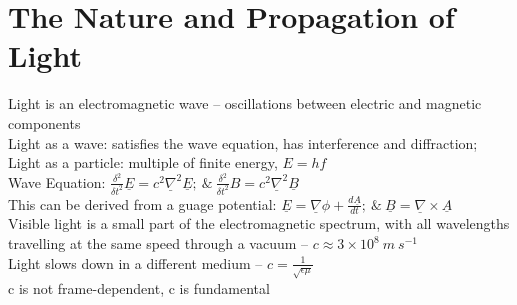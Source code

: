 \documentclass[a4paper, 11pt, fleqn, normalem]{report}
\begin{document}
\section{The Nature and Propagation of Light}
Light is an electromagnetic wave -- oscillations between electric and magnetic components \\
Light as a wave: satisfies the wave equation, has interference and diffraction; \\
Light as a particle: multiple of finite energy, $E = hf$ \\
Wave Equation: $\frac{\delta^{2}}{\delta t^{2}}\underline{E} = c^{2}\underline{\nabla}^{2}\underline{E};~\&~ \frac{\delta^{2}}{\delta t^{2}}B = c^{2}\underline{\nabla}^{2}\underline{B}$ \\
This can be derived from a guage potential: $\underline{E} = \underline{\nabla}\phi + \frac{d\underline{A}}{dt};~\&~\underline{B} = \underline{\nabla}\times\underline{A}$ \\
Visible light is a small part of the electromagnetic spectrum, with all wavelengths travelling at the same speed through a vacuum -- $c \approx 3\times10^{8}\:m\:s^{-1}$ \\
Light slows down in a different medium -- $c = \frac{1}{\sqrt{\epsilon\mu}}$\\
c is not frame-dependent, c is fundamental
\end{document}
